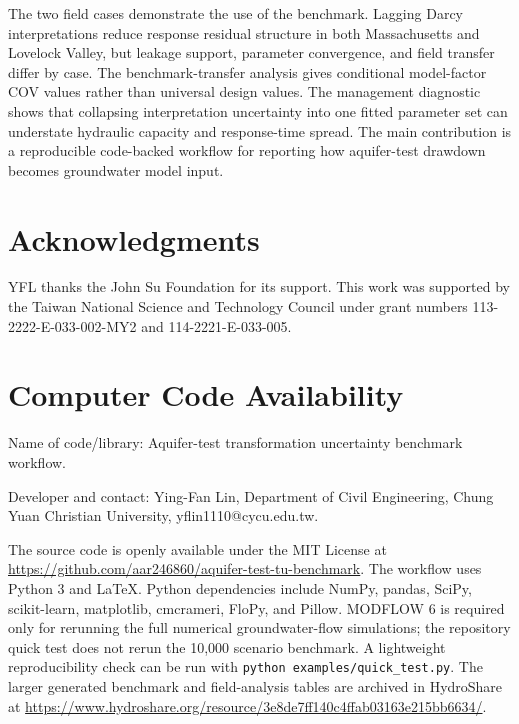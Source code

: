 \documentclass[a4paper,fleqn]{cas-sc}
\begin{document}
The two field cases demonstrate the use of the benchmark. Lagging Darcy interpretations reduce response residual structure in both Massachusetts and Lovelock Valley, but leakage support, parameter convergence, and field transfer differ by case. The benchmark-transfer analysis gives conditional model-factor COV values rather than universal design values. The management diagnostic shows that collapsing interpretation uncertainty into one fitted parameter set can understate hydraulic capacity and response-time spread. The main contribution is a reproducible code-backed workflow for reporting how aquifer-test drawdown becomes groundwater model input.

\section*{Acknowledgments}

YFL thanks the John Su Foundation for its support. This work was supported by the Taiwan National Science and Technology Council under grant numbers 113-2222-E-033-002-MY2 and 114-2221-E-033-005.

\section*{Computer Code Availability}

Name of code/library: Aquifer-test transformation uncertainty benchmark workflow.

Developer and contact: Ying-Fan Lin, Department of Civil Engineering, Chung Yuan Christian University, yflin1110@cycu.edu.tw.

The source code is openly available under the MIT License at \url{https://github.com/aar246860/aquifer-test-tu-benchmark}. The workflow uses Python 3 and LaTeX. Python dependencies include NumPy, pandas, SciPy, scikit-learn, matplotlib, cmcrameri, FloPy, and Pillow. MODFLOW 6 is required only for rerunning the full numerical groundwater-flow simulations; the repository quick test does not rerun the 10,000 scenario benchmark. A lightweight reproducibility check can be run with \texttt{python examples/quick\_test.py}. The larger generated benchmark and field-analysis tables are archived in HydroShare at \url{https://www.hydroshare.org/resource/3e8de7ff140c4ffab03163e215bb6634/}.

\nolinenumbers


\end{document}
